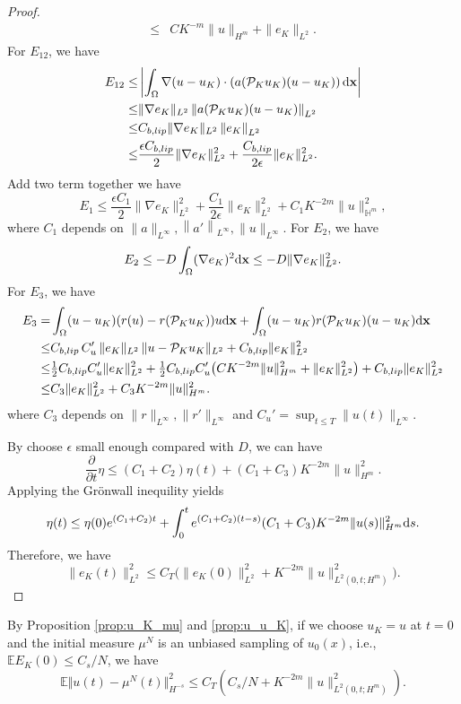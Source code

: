 \documentclass[a4paper,fleqn]{cas-sc}
\theoremstyle{definition}
\theoremstyle{remark}
\begin{document}
\begin{proof}
\[\begin{aligned}
\leq & C K^{-m} \|u\|_{H^m} + \|e_K\|_{L^2}.
\end{aligned}
\]
For $E_{12}$, we have 
\[
\begin{aligned}
    E_{12} \leq& \left| \int_\Omega \nabla(u-u_K) \cdot \left(a(\mathcal P_K u_K )(u  - u_K )\right)\mathrm{d} \mathbf{x} \right|\\
    \leq& \|\nabla e_K\|_{L^2}\left\|a(\mathcal P_K u_K )(u  - u_K ) \right\|_{L^2} \\
    \leq& C_{b,lip} \|\nabla e_K\|_{L^2}\left\|e_K \right\|_{L^2} \\
    \leq& \frac{\epsilon C_{b,lip}}{2}\|\nabla e_K\|_{L^2}^2 +\frac{C_{b,lip}}{2\epsilon}\|e_K\|_{L^2}^2.
\end{aligned}
\]
Add two term together we have 
\[
E_1 \leq \frac{\epsilon C_1}{2}\|\nabla e_K\|_{L^2}^2 +\frac{C_1}{2\epsilon}\| e_K\|_{L^2}^2 + C_1 K^{-2m}\|u\|_{\mathbb H^m}^2,
\]
where $C_1$  depends on $ \|a\|_{L^\infty},\left\|a'\right\|_{L^\infty},\|u\|_{L^\infty}$.
For $E_2$, we have 
\[
E_2 \leq - D\int_\Omega (\nabla e_K )^2\mathrm{d} \mathbf{x} \leq -D\|\nabla e_K\|^2_{L^2}.
\]
For $E_3$, we have 
\[
\begin{aligned}
    E_3 = &   \int_\Omega (u-u_K)  (r(u) - r(\mathcal P_K  u_K )) u \mathrm{d} \mathbf{x} 
     +  \int_\Omega (u-u_K)  r(\mathcal P_K  u_K ) (u-u_K) \mathrm{d} \mathbf{x} \\
    \leq & C_{b,lip}\,C_u'\,\|e_K\|_{L^2}\,\|u-\mathcal P_K u_K\|_{L^2 }
     +C_{b,lip} \|e_K\|_{L^2}^2\\
    \leq & \tfrac{1}{2}C_{b,lip}C_u' \|e_K\|_{L^2} ^2 + \tfrac{1}{2}C_{b,lip}C_u'\bigl( C K^{-2m} \|u\|_{H^m}^2 + \|e_K\|_{L^2}^2\bigr)
     +C_{b,lip} \|e_K\|_{L^2}^2\\
    \leq & C_3 \|e_K\|_{L^2}^2+ C_3 K^{-2m} \|u\|_{H^m}^2.
\end{aligned}
\]
where $C_3$ depends on $\|r\|_{L^\infty},\|r'\|_{L^\infty}$ and $C_u'=\sup_{t\le T}\|u(t)\|_{L^\infty}$.

By choose $\epsilon$ small enough compared with $D$, we can have
\[
\frac{\partial }{\partial t }\eta \leq(C_1+C_2)\eta(t) + (C_1+C_3) K^{-2m} \|u\|_{H^m}^2.
\]
Applying the Gr\"onwall inequility yields
$$\eta(t) \le \eta(0)e^{(C_1+C_2)t} + \int_0^t e^{(C_1+C_2)(t-s)} (C_1+C_3) K^{-2m} \|u(s)\|_{H^m}^2 \mathrm{d} s.$$
Therefore, we have
$$\|e_K(t)\|_{L^2}^2 \le C_T \Big( \|e_K(0)\|_{L^2}^2 + K^{-2m} \|u\|_{L^2(0,t;H^m)}^2 \Big).$$
\end{proof}

By Proposition \ref{prop:u_K_mu} and \ref{prop:u_u_K}, if we choose $u_K = u$ at $t=0$ and the initial measure $\mu^N$ is an unbiased sampling of $u_0(x)$, i.e., $\mathbb{E} E_K(0) \le  C_s/N$, we have 
\begin{equation}\label{eq:u-muN-cont}
\mathbb{E}\Vert u(t) - \mu^N(t)\Vert_{H^{-s}}^2 \le C_T \left(C_s/N + K^{-2m} \|u\|_{L^2(0,t;H^m)}^2 \right).     
\end{equation}
%
\end{document}
